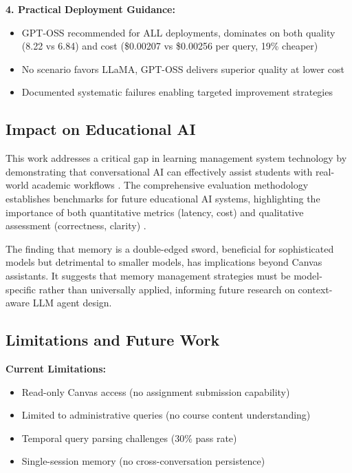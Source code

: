 \documentclass{article}
\begin{document}
\textbf{4. Practical Deployment Guidance:}
\begin{itemize}
    \item GPT-OSS recommended for ALL deployments, dominates on both quality (8.22 vs 6.84) and cost (\$0.00207 vs \$0.00256 per query, 19\% cheaper)
    \item No scenario favors LLaMA, GPT-OSS delivers superior quality at lower cost
    \item Documented systematic failures enabling targeted improvement strategies
\end{itemize}

\subsection{Impact on Educational AI}

This work addresses a critical gap in learning management system technology by demonstrating that conversational AI can effectively assist students with real-world academic workflows \cite{genai2024higher, lms2025ai}. The comprehensive evaluation methodology establishes benchmarks for future educational AI systems, highlighting the importance of both quantitative metrics (latency, cost) and qualitative assessment (correctness, clarity) \cite{teachable2025agents}.

The finding that memory is a double-edged sword, beneficial for sophisticated models but detrimental to smaller models, has implications beyond Canvas assistants. It suggests that memory management strategies must be model-specific rather than universally applied, informing future research on context-aware LLM agent design.

\subsection{Limitations and Future Work}

\textbf{Current Limitations:}
\begin{itemize}
    \item Read-only Canvas access (no assignment submission capability)
    \item Limited to administrative queries (no course content understanding)
    \item Temporal query parsing challenges (30\% pass rate)
    \item Single-session memory (no cross-conversation persistence)
\end{itemize}
\end{document}
